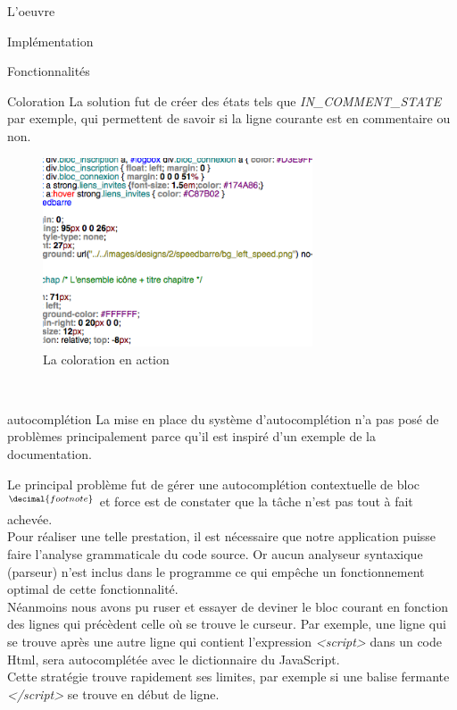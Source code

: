 \documentclass[a4paper, 12pt]{report}
\begin{document}
\begin{part}{L'oeuvre}
\begin{chapter}{Implémentation}
\begin{section}{Fonctionnalités}
\begin{subsection}{Coloration}
					La solution fut de créer des états tels que \emph{IN_COMMENT_STATE} par exemple, qui permettent de savoir si la ligne courante
					est en commentaire ou non.
					\begin{figure}[h]
						\begin{center}
							\includegraphics[width=8cm]{images/screenColoration.png}
							\caption{La coloration en action}
						\end{center}
					\end{figure}~\\					
				\end{subsection}
				\begin{subsection}{\Gls{autocomplétion}}
				\label{autocompl}
					La mise en place du système d'autocomplétion n'a pas posé de problèmes principalement parce qu'il est inspiré d'un exemple de
					la documentation.\\

					\addtocounter{footnote}{3}
					\footnotetext[\value{footnote}]{le bloc désigne un morceau de code inclus dans un autre morceau de code.}
					Le principal problème fut de gérer une \gls{autocomplétion} contextuelle de bloc$^{\decimal{footnote}}$
					et force est de constater que la tâche n'est pas tout à fait achevée.\\
					Pour réaliser une telle prestation, il est nécessaire que notre application puisse faire l'analyse
					grammaticale du code source. Or aucun analyseur syntaxique (\gls{parseur}) n'est inclus dans le programme ce qui empêche
					un fonctionnement optimal de cette fonctionnalité.\\


					Néanmoins nous avons pu ruser et essayer de deviner le bloc courant en fonction des lignes qui précèdent celle où se
					trouve le curseur. Par exemple, une ligne qui se trouve après une autre ligne qui contient l'expression \emph{<script>}
					dans un code \gls{Html}, sera autocomplétée avec le dictionnaire du \gls{JavaScript}.\\
					Cette stratégie trouve rapidement ses limites, par exemple si une balise fermante \emph{</script>} se trouve en début
					de ligne.\\



\end{subsection}
\end{section}
\end{chapter}
\end{part}
\end{document}
